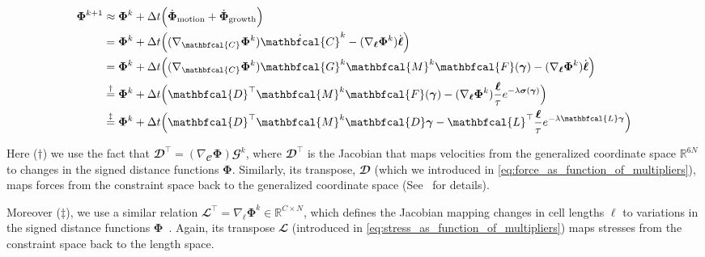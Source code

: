 \documentclass[conference]{IEEEtran}
\begin{document}
\begin{equation}\label{eq:phi_expanded}
    \small
    \begin{split}
        \mathbf{\Phi}^{k+1} & \approx \mathbf{\Phi}^k + \Delta t \Bigl( \dot{\mathbf{\Phi}}_{\text{motion}} + \dot{\mathbf{\Phi}}_{\text{growth}} \Bigr)\\
        & = \mathbf{\Phi}^k + \Delta t \Bigl( (\nabla_{\mathbfcal{C}} \mathbf{\Phi}^k) \dot{\mathbfcal{C}}^k - (\nabla_{\boldsymbol{\ell}} \mathbf{\Phi}^k) \dot{\boldsymbol{\ell}} \Bigr)\\
        & = \mathbf{\Phi}^k + \Delta t \Bigl( (\nabla_{\mathbfcal{C}} \mathbf{\Phi}^k) \mathbfcal{G}^k \mathbfcal{M}^k  \mathbfcal{F}(\boldsymbol{\gamma}) - (\nabla_{\boldsymbol{\ell}} \mathbf{\Phi}^k) \dot{\boldsymbol{\ell}} \Bigr)\\
        & \overset{\dagger}{=}
        \mathbf{\Phi}^k + \Delta t \Bigl( \mathbfcal{D}^\top \mathbfcal{M}^k  \mathbfcal{F}(\boldsymbol{\gamma})
        - (\nabla_{\boldsymbol{\ell}} \mathbf{\Phi}^k) \frac{\boldsymbol{\ell}}{\tau}
        e^{-\lambda \boldsymbol{\sigma}(\boldsymbol{\gamma})} \Bigr)\\
        & \overset{\ddagger}{=} \mathbf{\Phi}^k + \Delta t \Bigl( \mathbfcal{D}^\top \mathbfcal{M}^k \mathbfcal{D} \boldsymbol{\gamma} - \mathbfcal{L}^\top \frac{\boldsymbol{\ell}}{\tau} e^{-\lambda \mathbfcal{L} \boldsymbol{\gamma}} \Bigr)
    \end{split}
\end{equation}

Here ($\dagger$) we use the fact that $\mathbfcal{D}^\top = (\nabla_{\mathbfcal{C}} \mathbf{\Phi}) \mathbfcal{G}^k$, where $\mathbfcal{D}^\top$ is the Jacobian that maps velocities from the generalized coordinate space $\mathbb{R}^{6N}$ to changes in the signed distance functions $\mathbf{\Phi}$. Similarly, its transpose, $\mathbfcal{D}$ (which we introduced in \autoref{eq:force_as_function_of_multipliers}), maps forces from the constraint space back to the generalized coordinate space (See~\cite{Weady2024SM, Tasora2008} for details).

Moreover ($\ddagger$), we use a similar relation $\mathbfcal{L}^\top = \nabla_{\boldsymbol{\ell}} \mathbf{\Phi}^k \in \mathbb{R}^{C \times N}$, which defines the Jacobian mapping changes in cell lengths $\boldsymbol{\ell}$ to variations in the signed distance functions $\mathbf{\Phi}$~\cite{Weady2024SM}. Again, its transpose $\mathbfcal{L}$ (introduced in \autoref{eq:stress_as_function_of_multipliers}) maps stresses from the constraint space back to the length space.
\end{document}
